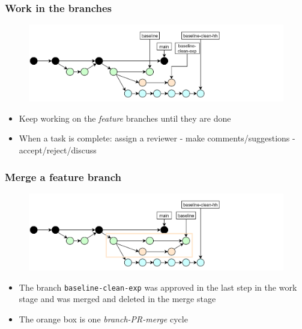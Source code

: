 \documentclass[aspectratio=169]{beamer} %
\begin{document}
\begin{frame}
	\frametitle{Work in the branches}

	\vspace{-.5cm}
	\begin{minipage}[t][5cm][t]{\textwidth}
		\begin{figure}
			\centering
			\includegraphics[width=\textwidth]{./img/dime-gitflow-network-2-3.png}
		\end{figure}
	\end{minipage}

	\vspace{-.5cm}
	\begin{minipage}[t][5cm][t]{\textwidth}
		\begin{itemize}
			\setlength\itemsep{.5em}
			\item Keep working on the \textit{feature} branches until
			they are done
			\item When a task is complete: assign a reviewer
			- make comments/suggestions - accept/reject/discuss
		\end{itemize}
	\end{minipage}
\end{frame}

\begin{frame}
	\frametitle{Merge a feature branch}

	\vspace{-.5cm}
	\begin{minipage}[t][5cm][t]{\textwidth}
		\begin{figure}
			\centering
			\includegraphics[width=\textwidth]{./img/dime-gitflow-network-2-4.png}
		\end{figure}
	\end{minipage}

	\vspace{-.5cm}
	\begin{minipage}[t][5cm][t]{\textwidth}
		\begin{itemize}
			\setlength\itemsep{.5em}
			\item The branch \texttt{baseline-clean-exp} was
			approved in the last step in the work stage and
			was merged and deleted in the merge stage
			\item The orange box is one \textit{branch-PR-merge} cycle
		\end{itemize}
	\end{minipage}
\end{frame}
\end{document}
